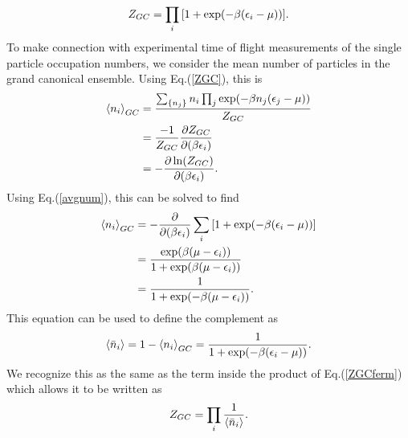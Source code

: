 \begin{equation}
    Z_{GC}=\prod_{i}\qty[1+\exp(-\beta\qty(\epsilon_i-\mu))]. \label{ZGCferm}
\end{equation}
To make connection with experimental time of flight measurements of the single particle occupation numbers, we consider the mean number of particles in the grand canonical ensemble. Using Eq.\@ (\ref{ZGC}), this is 
\begin{align}
    \left<{n_i}\right>_{GC}&=\frac{\sum_{\{n_j\}} n_i \prod_j \exp(-\beta n_j(\epsilon_j-\mu))}{Z_{GC}}\nonumber\\
    &=\frac{-1}{Z_{GC}}\frac{\partial Z_{GC}}{\partial (\beta\epsilon_i)}\nonumber\\
    &=-\frac{\partial \ln(Z_{GC})}{\partial (\beta \epsilon_i)}. \label{avgnum}
\end{align}
Using Eq.\@ (\ref{avgnum}), this can be solved to find 
\begin{align}
    \left<{n_i}\right>_{GC}&=-\frac{\partial}{\partial (\beta\epsilon_i)} \sum_i \qty[1+\exp(-\beta\qty(\epsilon_i-\mu))]\nonumber\\
    &=\frac{\exp(\beta(\mu-\epsilon_i))}{1+\exp(\beta(\mu-\epsilon_i))}\nonumber\\
    &=\frac{1}{1+\exp(-\beta(\mu-\epsilon_i))}. \label{GCoccprob}
\end{align}
This equation can be used to define the complement as
\begin{equation}
    \left<{\Bar{n}_i}\right>=1-\left<{n_i}\right>_{GC}=\frac{1}{1+\exp(-\beta(\epsilon_i-\mu))}. \label{GCcomplement}
\end{equation}
We recognize this as the same as the term inside the product of Eq.\@ (\ref{ZGCferm}) which allows it to be written as 
\begin{equation}
    Z_{GC}=\prod_i \frac{1}{\left<{\Bar{n}_i}\right>}. \label{GCq}
\end{equation}

